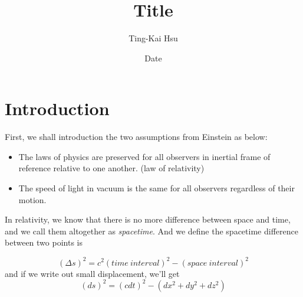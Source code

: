 \documentclass[12pt]{article}
\title{Title}
\author{Ting-Kai Hsu}
\date{Date}
\begin{document}
\section{Introduction}

First, we shall introduction the two assumptions from Einstein as below:

\begin{itemize}
    \item The laws of physics are preserved for all observers in inertial frame of reference relative to one another. (law of relativity)
    \item The speed of light in vacuum is the same for all observers regardless of their motion.
\end{itemize}

In relativity, we know that there is no more difference between space and time, and we call them altogether as \textit{spacetime}. And we define the spacetime difference between two points is 

\begin{center}
    \[ (\Delta s)^2 = c^2(time\ interval)^2 - (space\ interval)^2\]
    and if we write out small displacement, we'll get
    \[ (ds)^2 = (cdt)^2 - (dx^2 + dy^2 + dz^2) \]
\end{center}
\end{document}
